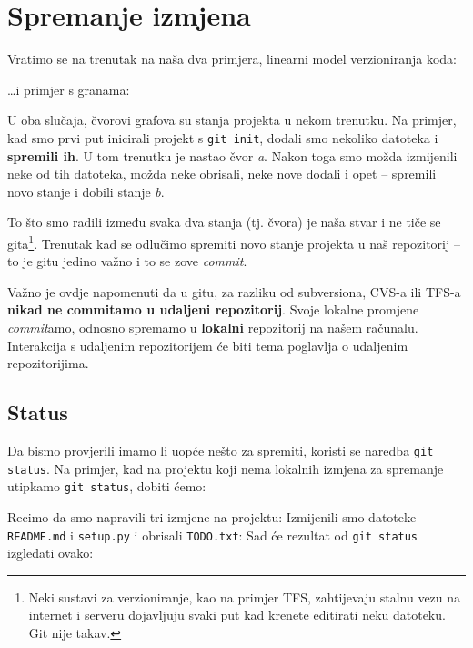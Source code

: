 \chapter*{Spremanje izmjena}

Vratimo se na trenutak na naša dva primjera, linearni model verzioniranja koda:



\dots{}i primjer s granama:



U oba slučaja, čvorovi grafova su stanja projekta u nekom trenutku.
Na primjer, kad smo prvi put inicirali projekt s \verb+git init+, dodali smo nekoliko datoteka i \textbf{spremili ih}. 
U tom trenutku je nastao čvor \emph a.
Nakon toga smo možda izmijenili neke od tih datoteka, možda neke obrisali, neke nove dodali i opet -- spremili novo stanje i dobili stanje \emph b.

To što smo radili između svaka dva stanja (tj. čvora) je naša stvar i ne tiče se gita\footnote{Neki sustavi za verzioniranje, kao na primjer TFS, zahtijevaju stalnu vezu na internet i serveru dojavljuju svaki put kad krenete editirati neku datoteku. Git nije takav.}.
Trenutak kad se odlučimo spremiti novo stanje projekta u naš repozitorij -- to je gitu jedino važno i to se zove \emph{commit}.

Važno je ovdje napomenuti da u gitu, za razliku od subversiona, CVS-a ili TFS-a \textbf{nikad ne commitamo u udaljeni repozitorij}. 
Svoje lokalne promjene \emph{commit}amo, odnosno spremamo u \textbf{lokalni} repozitorij na našem računalu.
Interakcija s udaljenim repozitorijem će biti tema poglavlja o udaljenim repozitorijima.

\section*{Status}

Da bismo provjerili imamo li uopće nešto za spremiti, koristi se naredba \verb+git status+.
Na primjer, kad na projektu koji nema lokalnih izmjena za spremanje utipkamo \verb+git status+, dobiti ćemo:



Recimo da smo napravili tri izmjene na projektu:
Izmijenili smo datoteke \verb+README.md+ i \verb+setup.py+ i obrisali \verb+TODO.txt+:
Sad će rezultat od \verb+git status+ izgledati ovako:

